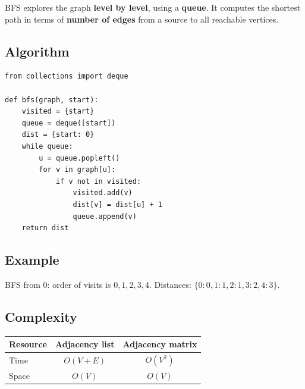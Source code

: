 \documentclass[11pt,a4paper]{article}
\begin{document}
BFS explores the graph \textbf{level by level}, using a \textbf{queue}. It computes the shortest path in terms of \textbf{number of edges} from a source to all reachable vertices.

\subsection{Algorithm}

\begin{lstlisting}
from collections import deque

def bfs(graph, start):
    visited = {start}
    queue = deque([start])
    dist = {start: 0}
    while queue:
        u = queue.popleft()
        for v in graph[u]:
            if v not in visited:
                visited.add(v)
                dist[v] = dist[u] + 1
                queue.append(v)
    return dist
\end{lstlisting}

\subsection{Example}

\begin{center}
\end{center}

BFS from 0: order of visits is $0, 1, 2, 3, 4$. Distances: $\{0: 0, 1: 1, 2: 1, 3: 2, 4: 3\}$.

\subsection{Complexity}

\begin{center}
\begin{tabular}{lcc}
\toprule
Resource & Adjacency list & Adjacency matrix \\
\midrule
Time & $O(V + E)$ & $O(V^2)$ \\
Space & $O(V)$ & $O(V)$ \\
\bottomrule
\end{tabular}
\end{center}
\end{document}
